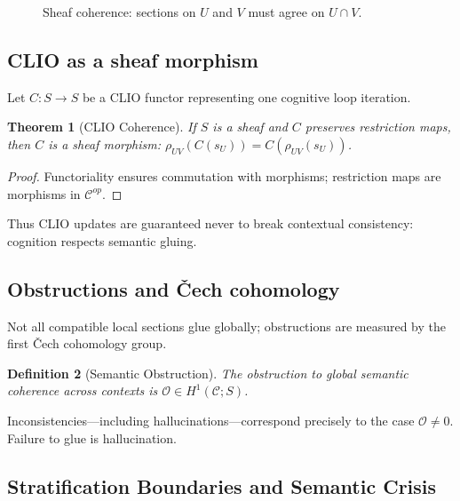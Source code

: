 \documentclass[11pt,a4paper,twocolumn]{article}
\newtheorem{theorem}{Theorem}[section]
\newtheorem{definition}[theorem]{Definition}
\begin{document}
\begin{figure}[H]
\centering
{}
\caption{Sheaf coherence: sections on $U$ and $V$ must agree on $U \cap V$.}
\end{figure}

\subsection{CLIO as a sheaf morphism}

Let $C : S \to S$ be a CLIO functor representing one cognitive loop
iteration.

\begin{theorem}[CLIO Coherence]
If $S$ is a sheaf and $C$ preserves restriction maps, then $C$ is a
sheaf morphism: $\rho_{UV}(C(s_U)) = C(\rho_{UV}(s_U))$.
\end{theorem}

\begin{proof}
Functoriality ensures commutation with morphisms; restriction maps are
morphisms in $\mathcal{C}^{op}$.
\end{proof}

Thus CLIO updates are guaranteed never to break contextual consistency:
cognition respects semantic gluing.

\subsection{Obstructions and Čech cohomology}

Not all compatible local sections glue globally; obstructions are
measured by the first Čech cohomology group.

\begin{definition}[Semantic Obstruction]
The obstruction to global semantic coherence across contexts is
$\mathcal{O} \in H^1(\mathcal{C}; S)$.
\end{definition}

Inconsistencies---including hallucinations---correspond precisely to the
case $\mathcal{O} \neq 0$. Failure to glue is hallucination.

\subsection{Stratification Boundaries and Semantic Crisis}
\end{document}
